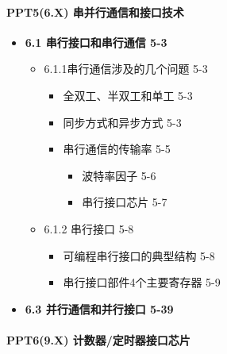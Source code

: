 \documentclass[zihao=5,linespread=1,heading=false,autoindent=0pt]{ctexart}
\newenvironment{citemize}%
{\begin{itemize}[parsep=0pt,itemsep=0pt,topsep=0pt,partopsep=0pt,labelwidth=1em,leftmargin=*]}
{\end{itemize}}
\theoremstyle{exampstyle} \newtheorem{definition}{定义}[section]
\theoremstyle{exampstyle} \newtheorem{example}{例}[section]
\theoremstyle{exampstyle} \newtheorem{theorem}{定理}[section]
\theoremstyle{exampstyle} \newtheorem{lemma}{引理}[section]
\theoremstyle{exampstyle} \newtheorem{myproof}{证明}[section]
\begin{document}
\begin{multicols*}{3}
    \hypertarget{ppt56.x-ux4e32ux5e76ux884cux901aux4fe1ux548cux63a5ux53e3ux6280ux672f}{%
    \paragraph{PPT5(6.X)
    串并行通信和接口技术}\label{ppt56.x-ux4e32ux5e76ux884cux901aux4fe1ux548cux63a5ux53e3ux6280ux672f}}
    
    \begin{citemize}
     
    \item
      \textbf{6.1 串行接口和串行通信 5-3}
    
      \begin{citemize}
       
      \item
        6.1.1串行通信涉及的几个问题 5-3
    
        \begin{citemize}
         
        \item
          全双工、半双工和单工 5-3
        \item
          同步方式和异步方式 5-3
        \item
          串行通信的传输率 5-5
    
          \begin{citemize}
           
          \item
            波特率因子 5-6
          \item
            串行接口芯片 5-7
          \end{citemize}
        \end{citemize}
      \item
        6.1.2 串行接口 5-8
    
        \begin{citemize}
         
        \item
          可编程串行接口的典型结构 5-8
        \item
          串行接口部件4个主要寄存器 5-9
        \end{citemize}
      \end{citemize}
    \item
      \textbf{6.3 并行通信和并行接口 5-39}
    \end{citemize}
    
    \hypertarget{ppt69.x-ux8ba1ux6570ux5668ux5b9aux65f6ux5668ux63a5ux53e3ux82afux7247}{%
    \paragraph{PPT6(9.X)
    计数器/定时器接口芯片}\label{ppt69.x-ux8ba1ux6570ux5668ux5b9aux65f6ux5668ux63a5ux53e3ux82afux7247}}
    

\end{multicols*}
\end{document}
